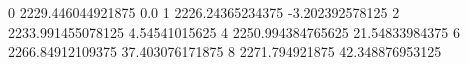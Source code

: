 0 2229.446044921875 0.0
1 2226.24365234375 -3.202392578125
2 2233.991455078125 4.54541015625
4 2250.994384765625 21.54833984375
6 2266.84912109375 37.403076171875
8 2271.794921875 42.348876953125
